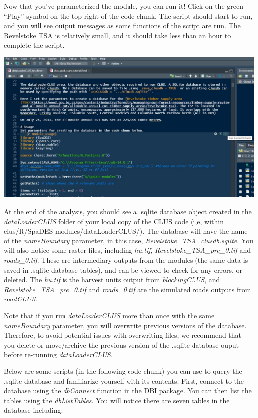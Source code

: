 \documentclass[
]{article}
\begin{document}
Now that you've parameterized the module, you can run it! Click on the
green ``Play'' symbol on the top-right of the code chunk. The script
should start to run, and you will see output messages as some functions
of the script are run. The Revelstoke TSA is relatively small, and it
should take less than an hour to complete the script.

\includegraphics{images/dataloader_run.jpg}

At the end of the analysis, you should see a .sqlite database object
created in the \emph{dataLoaderCLUS} folder of your local copy of the
CLUS code (i,e, within clus/R/SpaDES-modules/dataLoaderCLUS/). The
database will have the name of the \emph{nameBoundary} parameter, in
this case, \emph{Revelstoke\_TSA\_clusdb.sqlite}. You will also notice
some raster files, including \emph{hu.tif},
\emph{Revelstoke\_TSA\_pre\_0.tif} and \emph{roads\_0.tif}. These are
intermediary outputs from the modules (the same data is saved in .sqlite
database tables), and can be viewed to check for any errors, or deleted.
The \emph{hu.tif} is the harvest units output from \emph{blockingCLUS},
and \emph{Revelstoke\_TSA\_pre\_0.tif} and \emph{roads\_0.tif} are the
simulated roads outputs from \emph{roadCLUS}.

Note that if you run \emph{dataLoaderCLUS} more than once with the same
\emph{nameBoundary} parameter, you will overwrite previous versions of
the database. Therefore, to avoid potential issues with overwriting
files, we recommend that you delete or move/archive the previous version
of the .sqlite database ouput before re-running \emph{dataLoaderCLUS}.

Below are some scripts (in the following code chunk) you can use to
query the .sqlite database and familiarize yourself with its contents.
First, connect to the database using the \emph{dbConnect} function in
the DBI package. You can then list the tables using the
\emph{dbListTables}. You will notice there are seven tables in the
database including:
\end{document}
